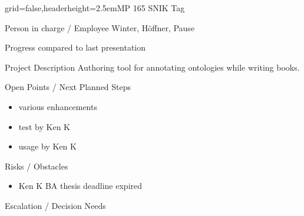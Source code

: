 \documentclass[english]{kiesgrube}
\begin{document}

\newpage

\begin{poster}{grid=false,headerheight=2.5em}{}{MP 165 SNIK Tag}{}{}
\begin{posterbox}[name=person,column=0,row=0]{Person in charge / Employee}
Winter, Höffner, Pause
\end{posterbox}
\begin{posterbox}[name=progress,below=person]{Progress compared to last presentation}
\end{posterbox}
\begin{posterbox}[name=description,column=1,row=0]{Project Description}
\small
Authoring tool for annotating ontologies while writing books.
\end{posterbox}
\begin{posterbox}[name=open,column=1,below=description]{Open Points / Next Planned Steps}
\begin{itemize}
\item various enhancements
\item test by Ken K
\item usage by Ken K
\end{itemize}
\end{posterbox}
\begin{posterbox}[name=risks,column=1,below=open]{Risks / Obstacles}
\begin{itemize}
\item Ken K BA thesis deadline expired
\end{itemize}
\end{posterbox}
\begin{posterbox}[name=escalation,column=1,below=risks]{Escalation / Decision Needs}

\end{posterbox}
\end{poster}
\end{document}
